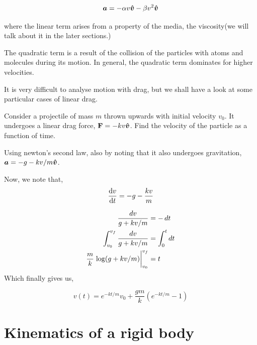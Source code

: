 \begin{equation*}
    \boldsymbol{a} = -\alpha v {{\boldsymbol{\hat{v}}}} - \beta v^2 {{\boldsymbol{\hat{v}}}}
\end{equation*}

where the linear term arises from a property of the media, 
the viscosity(we will talk about it in the later sections.)

The quadratic term is a result of the collision of the particles with atoms 
and molecules during its motion. In general, 
the quadratic term dominates for higher velocities.

It is very difficult to analyse motion with drag, but we shall have a look at some particular 
cases of linear drag.


\begin{example}
    Consider a projectile of mass \(m\) thrown upwards with initial velocity \(v_0\). It undergoes a linear drag 
    force, \(\mathbf{F} =  -kv {{\boldsymbol{\hat{v}}}}\). Find the velocity of the particle as 
    a function of time. 

    \begin{soln}
        Using newton's second law, also by noting that 
        it also undergoes gravitation, \(\boldsymbol{a} = -g -kv/m {{\boldsymbol{\hat{v}}}}\).

        Now, we note that, 
        \begin{equation*}
            \dv{v}{t} = -g  - \frac{kv}{m}
        \end{equation*}

        \begin{align*}
            \frac{\dd{v}}{g + kv/m} &= - \dd{t} \\
            \int_{v_0}^{v_f} \frac{\dd{v}}{g + kv/m} &= \int_{0}^{t}\dd{t} \\
            \frac{m}{k} \eval{\log(g + kv/m)}_{v_0}^{v_f} &= t \\
        \end{align*}
        Which finally gives us,

        \begin{equation}
            v(t) = e^{-kt/m}v_0 + \frac{gm}{k}(e^{-kt/m} - 1)
        \end{equation}

    \end{soln}
\end{example}

\section{Kinematics of a rigid body}

